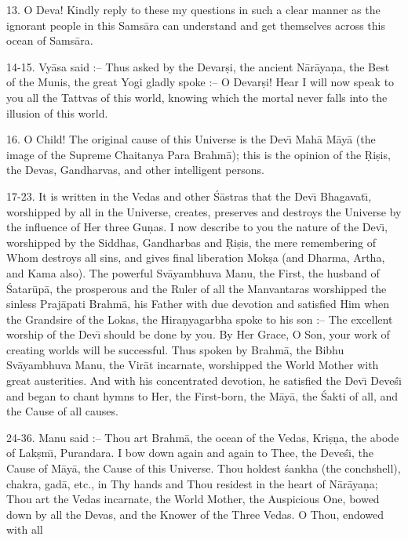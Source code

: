 13. O Deva! Kindly reply to these my questions in such a clear manner as the ignorant people in this Sams\=ara can understand and get themselves across this ocean of Sams\=ara.

14-15. Vy\=asa said :-- Thus asked by the Devar\d{s}i, the ancient N\=ar\=aya\d{n}a, the Best of the Munis, the great Yogi gladly spoke :-- O Devar\d{s}i! Hear I will now speak to you all the Tattvas of this world, knowing which the mortal never falls into the illusion of this world.

16. O Child! The original cause of this Universe is the Dev\={\i} Mah\=a M\=ay\=a (the image of the Supreme Chaitanya Para Brahm\=a); this is the opinion of the \d{R}i\d{s}is, the Devas, Gandharvas, and other intelligent persons.

17-23. It is written in the Vedas and other \'S\=astras that the Dev\={\i} Bhagavat\={\i}, worshipped by all in the Universe, creates, preserves and destroys the Universe by the influence of Her three Gu\d{n}as. I now describe to you the nature of the Dev\={\i}, worshipped by the Siddhas, Gandharbas and \d{R}i\d{s}is, the mere remembering of Whom destroys all sins, and gives final liberation Mok\d{s}a (and Dharma, Artha, and Kama also). The powerful Sv\=ayambhuva Manu, the First, the husband of \'Satar\=up\=a, the prosperous and the Ruler of all the Manvantaras worshipped the sinless Praj\=apati Brahm\=a, his Father with due devotion and satisfied Him when the Grandsire of the Lokas, the Hira\d{n}yagarbha spoke to his son :-- The excellent worship of the Dev\={\i} should be done by you. By Her Grace, O Son, your work of creating worlds will be successful. Thus spoken by Brahm\=a, the Bibhu Sv\=ayambhuva Manu, the Vir\=at incarnate, worshipped the World Mother with great austerities. And with his concentrated devotion, he satisfied the Dev\={\i} Deve\'s\={\i} and began to chant hymns to Her, the First-born, the M\=ay\=a, the \'Sakti of all, and the Cause of all causes.

24-36. Manu said :-- Thou art Brahm\=a, the ocean of the Vedas, Kri\d{s}\d{n}a, the abode of Lak\d{s}m\={\i}, Purandara. I bow down again and again to Thee, the Deve\'s\={\i}, the Cause of M\=ay\=a, the Cause of this Universe. Thou holdest \'sankha (the conchshell), chakra, gad\=a, etc., in Thy hands and Thou residest in the heart of N\=ar\=aya\d{n}a; Thou art the Vedas incarnate, the World Mother, the Auspicious One, bowed down by all the Devas, and the Knower of the Three Vedas. O Thou, endowed with all

